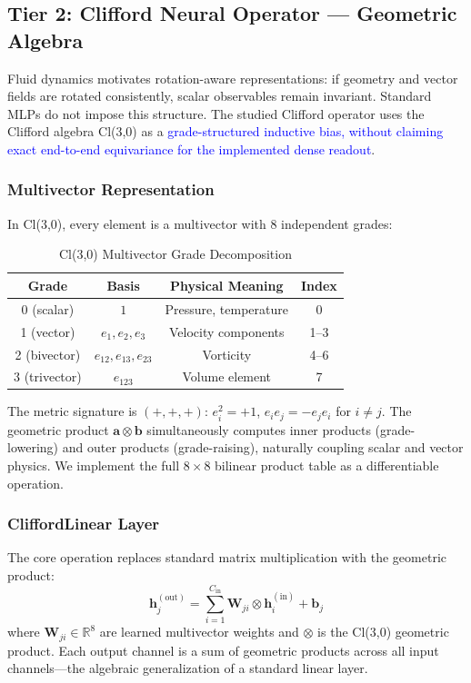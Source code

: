 \documentclass[journal]{IEEEtran}
\newcommand{\added}[1]{\textcolor{blue}{#1}}
\begin{document}
\subsection{Tier 2: Clifford Neural Operator --- Geometric Algebra}
\label{sec:clifford}

Fluid dynamics motivates rotation-aware representations: if geometry and vector fields are rotated consistently, scalar observables remain invariant. Standard MLPs do not impose this structure. The studied Clifford operator \cite{brandstetter2023clifford} uses the Clifford algebra Cl(3,0) as a \added{grade-structured inductive bias, without claiming exact end-to-end equivariance for the implemented dense readout}.

\subsubsection{Multivector Representation}
In Cl(3,0), every element is a multivector with 8 independent grades:

\begin{table}[htbp]
\caption{Cl(3,0) Multivector Grade Decomposition}
\label{tab:grades}
\centering
\begin{tabular}{cccc}
\toprule
\textbf{Grade} & \textbf{Basis} & \textbf{Physical Meaning} & \textbf{Index} \\
\midrule
0 (scalar) & $1$ & Pressure, temperature & 0 \\
1 (vector) & $e_1, e_2, e_3$ & Velocity components & 1--3 \\
2 (bivector) & $e_{12}, e_{13}, e_{23}$ & Vorticity & 4--6 \\
3 (trivector) & $e_{123}$ & Volume element & 7 \\
\bottomrule
\end{tabular}
\end{table}

The metric signature is $(+,+,+)$: $e_i^2 = +1$, $e_i e_j = -e_j e_i$ for $i \neq j$. The geometric product $\bm{a} \otimes \bm{b}$ simultaneously computes inner products (grade-lowering) and outer products (grade-raising), naturally coupling scalar and vector physics. We implement the full $8 \times 8$ bilinear product table as a differentiable operation.

\subsubsection{CliffordLinear Layer}
The core operation replaces standard matrix multiplication with the geometric product:
\begin{equation}
\bm{h}_j^{(\text{out})} = \sum_{i=1}^{C_\text{in}} \bm{W}_{ji} \otimes \bm{h}_i^{(\text{in})} + \bm{b}_j
\label{eq:clifford_linear}
\end{equation}
where $\bm{W}_{ji} \in \mathbb{R}^8$ are learned multivector weights and $\otimes$ is the Cl(3,0) geometric product. Each output channel is a sum of geometric products across all input channels---the algebraic generalization of a standard linear layer.
\end{document}

